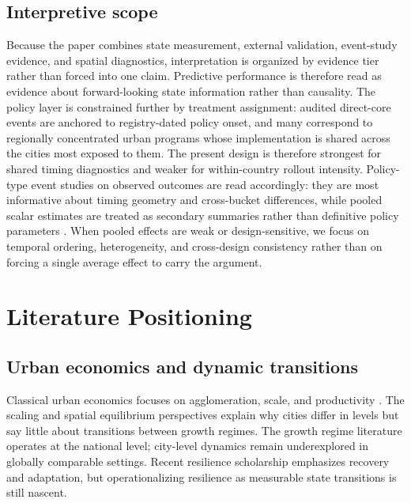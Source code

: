 \documentclass[11pt,a4paper]{article}
\begin{document}
\subsection{Interpretive scope}
Because the paper combines state measurement, external validation, event-study evidence, and spatial diagnostics, interpretation is organized by evidence tier rather than forced into one claim.
Predictive performance is therefore read as evidence about forward-looking state information rather than causality.
The policy layer is constrained further by treatment assignment: audited direct-core events are anchored to registry-dated policy onset, and many correspond to regionally concentrated urban programs whose implementation is shared across the cities most exposed to them.
The present design is therefore strongest for shared timing diagnostics and weaker for within-country rollout intensity.
Policy-type event studies on observed outcomes are read accordingly: they are most informative about timing geometry and cross-bucket differences, while pooled scalar estimates are treated as secondary summaries rather than definitive policy parameters \citep{athey2019machine,mullainathan2017machine,imbenwooldridge2009recent}.
When pooled effects are weak or design-sensitive, we focus on temporal ordering, heterogeneity, and cross-design consistency rather than on forcing a single average effect to carry the argument.

\section{Literature Positioning}
\label{sec:literature}

\subsection{Urban economics and dynamic transitions}
Classical urban economics focuses on agglomeration, scale, and productivity \citep{combes2012productivity,rozenfeld2011laws,bettencourt2007growth}.
The scaling and spatial equilibrium perspectives \citep{redding2017quantitative,roback2004local,moretti2012real} explain why cities differ in levels but say little about transitions between growth regimes.
The growth regime literature \citep{hausmann2005growth,eichengreen2012slowdown} operates at the national level; city-level dynamics remain underexplored in globally comparable settings.
Recent resilience scholarship \citep{martin2012regional} emphasizes recovery and adaptation, but operationalizing resilience as measurable state transitions is still nascent.
\end{document}
